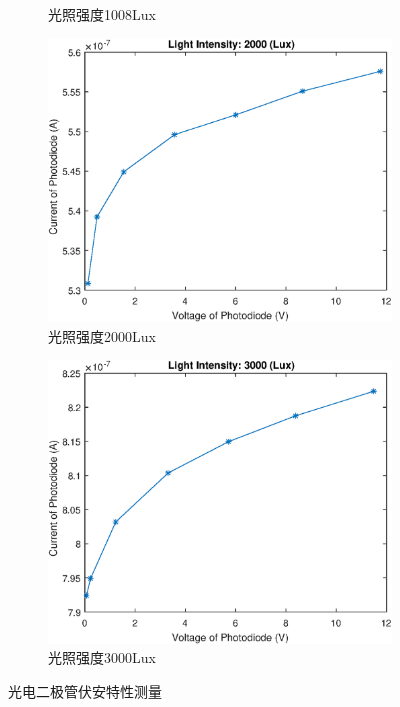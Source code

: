 \documentclass{ctexart}
\begin{document}
\begin{figure}[H]
\begin{subfigure}{.45\textwidth}
    \caption{光照强度1008Lux}
  \end{subfigure}
  \begin{subfigure}{.45\textwidth}
    \centering
    \includegraphics[width=\linewidth]{光电传感器综合实验图像/photodiode_2000Lux}
    \caption{光照强度2000Lux}
  \end{subfigure}
  \begin{subfigure}{.45\textwidth}
    \centering
    \includegraphics[width=\linewidth]{光电传感器综合实验图像/photodiode_3000Lux}
    \caption{光照强度3000Lux}
  \end{subfigure}
  \caption{光电二极管伏安特性测量}
\end{figure}
\end{document}
